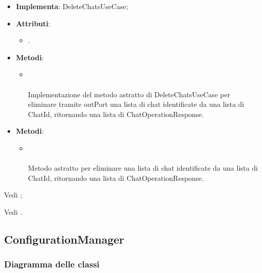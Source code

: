 \documentclass[10pt, a4paper]{article}
\begin{document}
\label{DeleteChatsServiceDettaglio}
\begin{itemize}
    \item \textbf{Implementa}: DeleteChatsUseCase;
    \item \textbf{Attributi}:
    \begin{itemize}
        \item {}.
    \end{itemize}
    \item \textbf{Metodi}:
    \begin{itemize}
        \item {}\\ \\
        Implementazione del metodo astratto di DeleteChatsUseCase per eliminare tramite outPort una lista di chat identificate da una lista di ChatId, ritornando una lista di ChatOperationResponse.
    \end{itemize}
\end{itemize}

\label{DeleteChatsUseCaseDettaglio}
\begin{itemize}
    \item \textbf{Metodi}:
    \begin{itemize}
        \item {}\\ \\
        Metodo astratto per eliminare una lista di chat identificate da una lista di ChatId, ritornando una lista di ChatOperationResponse.
    \end{itemize}
\end{itemize}



Vedi ;




Vedi .




\subsection{ConfigurationManager}
\subsubsection{Diagramma delle classi}
\end{document}
